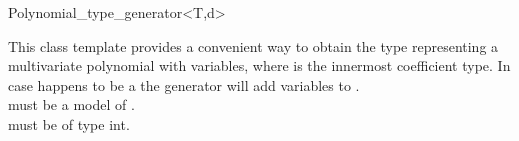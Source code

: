 \begin{ccRefClass} {Polynomial_type_generator<T,d>} \label{Polynomial_type_generator}

\ccDefinition

This class template provides a convenient way to obtain the type representing a multivariate polynomial with  variables, where  is the innermost coefficient type. In case  happens to be a  the generator will add  variables to .\\

 must be a model of .\\
 must be of type int. 

\ccTypes



\ccSeeAlso
{}\\

\end{ccRefClass} 
